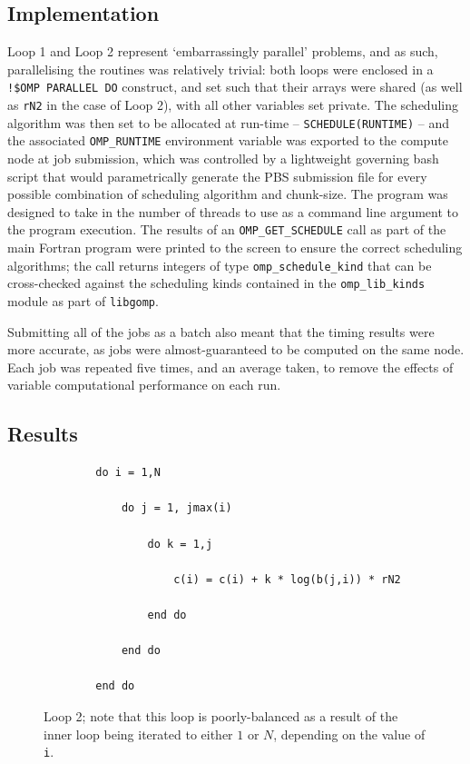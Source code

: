 \documentclass{article} %
\newcommand{\tp}{\texttt}
\begin{document}
\subsection*{Implementation}

Loop 1 and Loop 2 represent `embarrassingly parallel' problems, and as such, parallelising the routines was relatively trivial: both loops were enclosed in a \tp{!\$OMP PARALLEL DO} construct, and set such that their arrays were shared (as well as \tp{rN2} in the case of Loop 2), with all other variables set private.
The scheduling algorithm was then set to be allocated at run-time -- \tp{SCHEDULE(RUNTIME)} -- and the associated \tp{OMP\_RUNTIME} environment variable was exported to the compute node at job submission, which was controlled by a lightweight governing bash script that would parametrically generate the PBS submission file for every possible combination of scheduling algorithm and chunk-size.
The program was designed to take in the number of threads to use as a command line argument to the program execution.
The results of an \tp{OMP\_GET\_SCHEDULE} call as part of the main Fortran program were printed to the screen to ensure the correct scheduling algorithms; the call returns integers of type \tp{omp\_schedule\_kind} that can be cross-checked against the scheduling kinds contained in the \tp{omp\_lib\_kinds} module as part of \tp{libgomp}.

Submitting all of the jobs as a batch also meant that the timing results were more accurate, as jobs were almost-guaranteed to be computed on the same node.
Each job was repeated five times, and an average taken, to remove the effects of variable computational performance on each run.

\subsection*{Results}



\begin{figure}
    \begin{lstlisting}
        do i = 1,N

            do j = 1, jmax(i) 
        
                do k = 1,j 
                    
                    c(i) = c(i) + k * log(b(j,i)) * rN2
                
                end do
            
            end do
     
        end do
    \end{lstlisting}
    \caption{Loop 2; note that this loop is poorly-balanced as a result of the inner loop being iterated to either $1$ or $N$, depending on the value of \texttt{i}.}
    \label{listing:loop2}
\end{figure}
\end{document}
